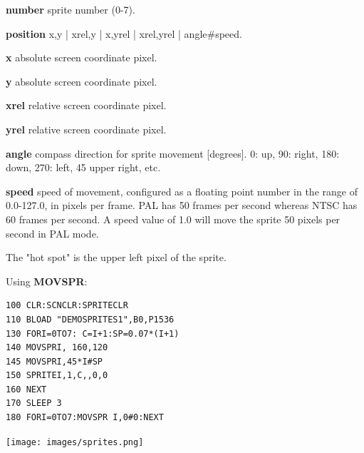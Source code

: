 \begin{description}[leftmargin=2cm,style=nextline]
                {\bf number} sprite number (0-7).

                {\bf position} x,y | xrel,y | x,yrel | xrel,yrel | angle\#speed.

                {\bf x} absolute screen coordinate pixel.

                {\bf y} absolute screen coordinate pixel.

                {\bf xrel} relative screen coordinate pixel.

                {\bf yrel} relative screen coordinate pixel.

                {\bf angle} compass direction for sprite movement [degrees].
                0: up, 90: right, 180: down, 270: left, 45 upper right, etc.

                {\bf speed} speed of movement, configured as a floating point number in the
                range of 0.0-127.0, in pixels per frame.
                PAL has 50 frames per second whereas NTSC has 60 frames per second.
                A speed value of 1.0 will move the sprite 50 pixels per second
                in PAL mode.


\item [Remarks:] The "hot spot" is the upper left pixel of the sprite.

\item [Example:] Using {\bf MOVSPR}:
\begin{tcolorbox}[colback=black,coltext=white]
\verbatimfont{\codefont}
\begin{verbatim}
100 CLR:SCNCLR:SPRITECLR
110 BLOAD "DEMOSPRITES1",B0,P1536
130 FORI=0TO7: C=I+1:SP=0.07*(I+1)
140 MOVSPRI, 160,120
145 MOVSPRI,45*I#SP
150 SPRITEI,1,C,,0,0
160 NEXT
170 SLEEP 3
180 FORI=0TO7:MOVSPR I,0#0:NEXT
\end{verbatim}
\end{tcolorbox}
\item \begin{center}\texttt{[image: images/sprites.png]}\end{center}
\end{description}



\newpage
